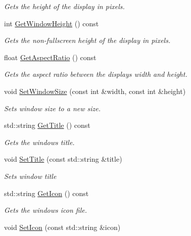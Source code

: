 \begin{DoxyCompactItemize}
\begin{DoxyCompactList}\small\item\em Gets the height of the display in pixels. \end{DoxyCompactList}\item 
int \hyperlink{class_flounder_1_1_display_a0468b37795b6689013225222927a8015}{Get\+Window\+Height} () const
\begin{DoxyCompactList}\small\item\em Gets the non-\/fullscreen height of the display in pixels. \end{DoxyCompactList}\item 
float \hyperlink{class_flounder_1_1_display_a57d9cb5bb1f6ffda1c0bd8c60c22b7ed}{Get\+Aspect\+Ratio} () const
\begin{DoxyCompactList}\small\item\em Gets the aspect ratio between the displays width and height. \end{DoxyCompactList}\item 
void \hyperlink{class_flounder_1_1_display_a8f95a2ad9ebedac32b1f95d76b6f265d}{Set\+Window\+Size} (const int \&width, const int \&height)
\begin{DoxyCompactList}\small\item\em Sets window size to a new size. \end{DoxyCompactList}\item 
std\+::string \hyperlink{class_flounder_1_1_display_a99246ee0817aa140129817df3687ca06}{Get\+Title} () const
\begin{DoxyCompactList}\small\item\em Gets the window\textquotesingle{}s title. \end{DoxyCompactList}\item 
void \hyperlink{class_flounder_1_1_display_a38d8c2feda74aa6a46900ba2ee845703}{Set\+Title} (const std\+::string \&title)
\begin{DoxyCompactList}\small\item\em Sets window title \end{DoxyCompactList}\item 
std\+::string \hyperlink{class_flounder_1_1_display_a1c18288e7422038fa1018bc4f416c6df}{Get\+Icon} () const
\begin{DoxyCompactList}\small\item\em Gets the window\textquotesingle{}s icon file. \end{DoxyCompactList}\item 
void \hyperlink{class_flounder_1_1_display_a533657ade23681f0e21643d5e4b9ce81}{Set\+Icon} (const std\+::string \&icon)

\end{DoxyCompactItemize}
